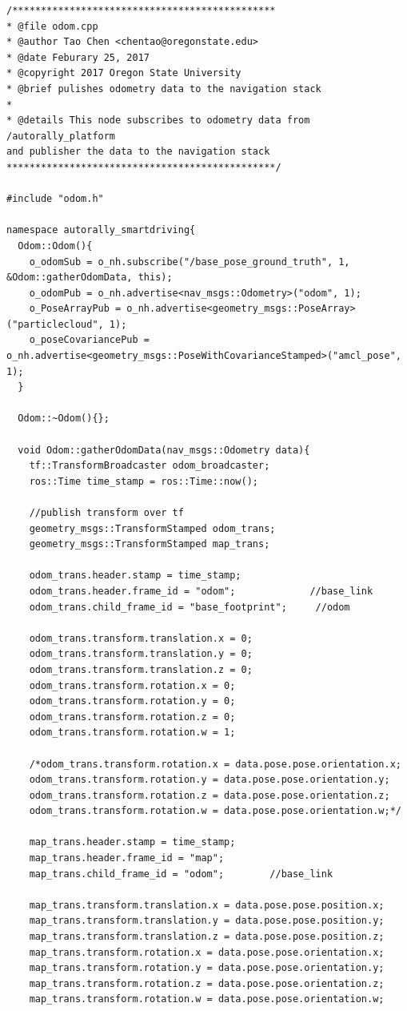 \documentclass[compsoc,draftclsnofoot,onecolumn,10pt]{IEEEtran}
\begin{document}
\begin{lstlisting}[frame=single,caption={ROS odom/transform node (not including the .h file.
The .h file is located in our github repository)}]
/**********************************************
* @file odom.cpp
* @author Tao Chen <chentao@oregonstate.edu>
* @date Feburary 25, 2017
* @copyright 2017 Oregon State University
* @brief pulishes odometry data to the navigation stack
*
* @details This node subscribes to odometry data from /autorally_platform
and publisher the data to the navigation stack
***********************************************/

#include "odom.h"

namespace autorally_smartdriving{
  Odom::Odom(){
    o_odomSub = o_nh.subscribe("/base_pose_ground_truth", 1, &Odom::gatherOdomData, this);
    o_odomPub = o_nh.advertise<nav_msgs::Odometry>("odom", 1);
    o_PoseArrayPub = o_nh.advertise<geometry_msgs::PoseArray>("particlecloud", 1);
    o_poseCovariancePub = o_nh.advertise<geometry_msgs::PoseWithCovarianceStamped>("amcl_pose", 1);
  }

  Odom::~Odom(){};

  void Odom::gatherOdomData(nav_msgs::Odometry data){
    tf::TransformBroadcaster odom_broadcaster;
    ros::Time time_stamp = ros::Time::now();

    //publish transform over tf
    geometry_msgs::TransformStamped odom_trans;
    geometry_msgs::TransformStamped map_trans;

    odom_trans.header.stamp = time_stamp;
    odom_trans.header.frame_id = "odom";             //base_link
    odom_trans.child_frame_id = "base_footprint";     //odom

    odom_trans.transform.translation.x = 0;
    odom_trans.transform.translation.y = 0;
    odom_trans.transform.translation.z = 0;
    odom_trans.transform.rotation.x = 0;
    odom_trans.transform.rotation.y = 0;
    odom_trans.transform.rotation.z = 0;
    odom_trans.transform.rotation.w = 1;

    /*odom_trans.transform.rotation.x = data.pose.pose.orientation.x;
    odom_trans.transform.rotation.y = data.pose.pose.orientation.y;
    odom_trans.transform.rotation.z = data.pose.pose.orientation.z;
    odom_trans.transform.rotation.w = data.pose.pose.orientation.w;*/

    map_trans.header.stamp = time_stamp;
    map_trans.header.frame_id = "map";
    map_trans.child_frame_id = "odom";        //base_link

    map_trans.transform.translation.x = data.pose.pose.position.x;
    map_trans.transform.translation.y = data.pose.pose.position.y;
    map_trans.transform.translation.z = data.pose.pose.position.z;
    map_trans.transform.rotation.x = data.pose.pose.orientation.x;
    map_trans.transform.rotation.y = data.pose.pose.orientation.y;
    map_trans.transform.rotation.z = data.pose.pose.orientation.z;
    map_trans.transform.rotation.w = data.pose.pose.orientation.w;


\end{lstlisting}
\end{document}
